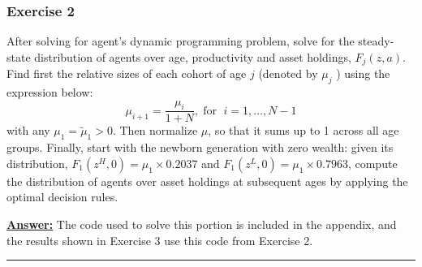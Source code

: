\documentclass{article} %
\theoremstyle{definition}
\newenvironment{solution}[1][Answer]{\begin{singlespace}\underline{\textbf{#1:}}\quad }{\ \rule{0.3em}{0.3em}\end{singlespace}} %
\begin{document}
\subsubsection*{Exercise 2}
After solving for agent's dynamic programming problem, solve for the steady-state distribution of agents over age, productivity and asset holdings, $ F_j (z, a) $. Find first the relative sizes of each cohort of age $ j $ (denoted by $ \mu_j $ ) using the expression below: \[ \mu_{i+1} = \frac{\mu_i}{1 +N}, \; \text{for } \; i = 1, \hdots, N-1  \]  with any $ \mu_1 = \tilde{\mu}_1 >0 $. Then normalize $ \mu $, so that it sums up to 1 across all age groups. Finally, start with the newborn generation with zero wealth: given its distribution, $ F_1(z^H, 0) = \mu_1 × 0.2037 $ and $ F_1(z^L, 0) = \mu_1×0.7963 $, compute the distribution of agents over asset holdings at subsequent ages by applying the optimal decision rules.
\begin{solution}
  The code used to solve this portion is included in the appendix, and the results shown in Exercise 3 use this code from Exercise 2.  
\end{solution}
\end{document}
